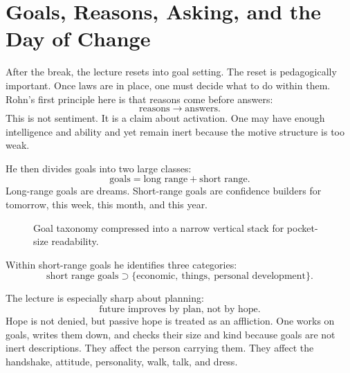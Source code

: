 \section{Goals, Reasons, Asking, and the Day of Change}

After the break, the lecture resets into goal setting. The reset is pedagogically important. Once laws are in place, one must decide what to do within them. Rohn's first principle here is that reasons come before answers:
\begin{equation}
\text{reasons} \to \text{answers}.
\end{equation}
This is not sentiment. It is a claim about activation. One may have enough intelligence and ability and yet remain inert because the motive structure is too weak.

He then divides goals into two large classes:
\begin{equation}
\text{goals} = \text{long range} + \text{short range}.
\end{equation}
Long-range goals are dreams. Short-range goals are confidence builders for tomorrow, this week, this month, and this year.

\begin{figure}[h]
\centering
{}
\caption{Goal taxonomy compressed into a narrow vertical stack for pocket-size readability.}
\end{figure}

Within short-range goals he identifies three categories:
\begin{equation}
\text{short range goals} \supset \{\text{economic},\ \text{things},\ \text{personal development}\}.
\end{equation}

The lecture is especially sharp about planning:
\begin{equation}
\text{future improves by plan, not by hope}.
\end{equation}
Hope is not denied, but passive hope is treated as an affliction. One works on goals, writes them down, and checks their size and kind because goals are not inert descriptions. They affect the person carrying them. They affect the handshake, attitude, personality, walk, talk, and dress.

